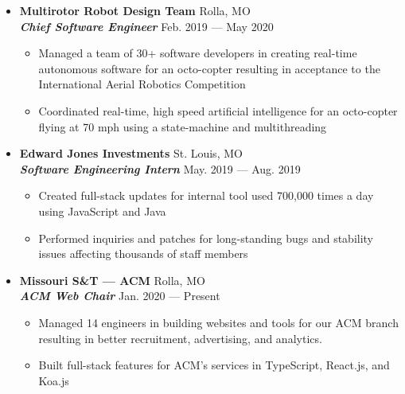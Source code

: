 \documentclass[9pt,oneside]{memoir}
\begin{document}
\begin{itemize}
      \item[] \textbf{Multirotor Robot Design Team}
            \hfill Rolla, MO\\
            \textit{\textbf{Chief Software Engineer}}
            \hfill Feb. 2019 --- May 2020
            \begin{itemize}
                  \item[\textbullet] Managed a team of 30+ software developers in
                        creating real-time autonomous software for an octo-copter resulting in
                        acceptance to the International Aerial Robotics Competition
                  \item[\textbullet] Coordinated real-time, high speed artificial intelligence for an
                        octo-copter flying at 70 mph using a state-machine and multithreading
            \end{itemize}

      \item[] \textbf{Edward Jones Investments}
            \hfill St. Louis, MO\\
            \textit{\textbf{Software Engineering Intern}}
            \hfill May. 2019 --- Aug. 2019
            \begin{itemize}
                  \item[\textbullet] Created full-stack updates for internal tool used 700,000 times a day using JavaScript and Java
                  \item[\textbullet] Performed inquiries and patches for long-standing bugs and stability issues affecting thousands of staff members
            \end{itemize}

      \item[] \textbf{Missouri S\&T --- ACM}
            \hfill Rolla, MO\\
            \textit{\textbf{ACM Web Chair}}
            \hfill Jan. 2020 --- Present
            \begin{itemize}
                  \item[\textbullet] Managed 14 engineers in building websites and tools for our ACM branch resulting in better
                        recruitment, advertising, and analytics.
                  \item[\textbullet] Built full-stack features for ACM's services in TypeScript, React.js, and Koa.js
            \end{itemize}
\end{itemize}
\end{document}
